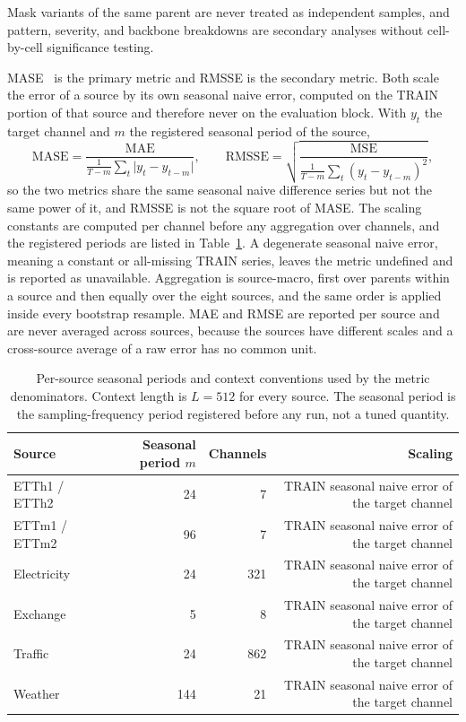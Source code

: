 \documentclass{article}
\begin{document}
Mask variants of the same parent are never
treated as independent samples, and pattern, severity, and backbone breakdowns are secondary
analyses without cell-by-cell significance testing.

MASE~\citep{hyndman2006mase} is the primary metric and RMSSE is the secondary metric. Both
scale the error of a source by its own seasonal naive error, computed on the TRAIN portion of
that source and therefore never on the evaluation block. With $y_t$ the target channel and $m$
the registered seasonal period of the source,
\begin{equation}
  \mathrm{MASE} = \frac{\mathrm{MAE}}{\frac{1}{T-m}\sum_{t} \lvert y_t - y_{t-m} \rvert},
  \qquad
  \mathrm{RMSSE} = \sqrt{\frac{\mathrm{MSE}}{\frac{1}{T-m}\sum_{t} (y_t - y_{t-m})^2}},
  \label{eq:metrics}
\end{equation}
so the two metrics share the same seasonal naive difference series but not the same power of
it, and RMSSE is not the square root of MASE. The scaling constants are computed per channel
before any aggregation over channels, and the registered periods are listed in
Table~\ref{tab:app-seasonality}. A degenerate seasonal naive error, meaning a constant or
all-missing TRAIN series, leaves the metric undefined and is reported as unavailable. Aggregation is source-macro, first over parents within a source and then equally over
the eight sources, and the same order is applied inside every bootstrap resample. MAE and RMSE
are reported per source and are never averaged across sources, because the sources have
different scales and a cross-source average of a raw error has no common unit.

\begin{table}[htbp]
  \caption{Per-source seasonal periods and context conventions used by the metric
  denominators. Context length is $L = 512$ for every source. The seasonal period is the
  sampling-frequency period registered before any run, not a tuned quantity.}
  \label{tab:app-seasonality}
  \centering
  \small
  \setlength{\tabcolsep}{4pt}
\begin{tabular*}{\textwidth}{@{\extracolsep{\fill}}lrrr@{}}
    \toprule
    Source & Seasonal period $m$ & Channels & Scaling \\
    \midrule
    ETTh1 / ETTh2 & 24 & 7 & TRAIN seasonal naive error of the target channel \\
    ETTm1 / ETTm2 & 96 & 7 & TRAIN seasonal naive error of the target channel \\
    Electricity & 24 & 321 & TRAIN seasonal naive error of the target channel \\
    Exchange & 5 & 8 & TRAIN seasonal naive error of the target channel \\
    Traffic & 24 & 862 & TRAIN seasonal naive error of the target channel \\
    Weather & 144 & 21 & TRAIN seasonal naive error of the target channel \\
    \bottomrule
  \end{tabular*}
\end{table}
\end{document}
